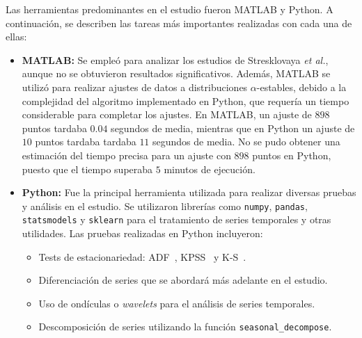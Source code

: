 Las herramientas predominantes en el estudio fueron MATLAB y Python. A continuación, se describen las tareas más importantes realizadas con cada una de ellas:

\begin{itemize}
\item \textbf{MATLAB:} Se empleó para analizar los estudios de Stresklovaya \textit{et al.}, aunque no se obtuvieron resultados significativos. Además, MATLAB se utilizó para realizar ajustes de datos a distribuciones $\alpha$-estables, debido a la complejidad del algoritmo implementado en Python, que requería un tiempo considerable para completar los ajustes. En MATLAB, un ajuste de $898$ puntos tardaba $0.04$ segundos de media, mientras que en Python un ajuste de $10$ puntos tardaba tardaba $11$ segundos de media. No se pudo obtener una estimación del tiempo precisa para un ajuste con $898$ puntos en Python, puesto que el tiempo superaba $5$ minutos de ejecución.
\item \textbf{Python:} Fue la principal herramienta utilizada para realizar diversas pruebas y análisis en el estudio. Se utilizaron librerías como \texttt{numpy}, \texttt{pandas}, \texttt{statsmodels} y \texttt{sklearn} para el tratamiento de series temporales y otras utilidades. Las pruebas realizadas en Python incluyeron:
\begin{itemize}
    \item Tests de estacionariedad: \ac{ADF}~\cite{dickey1979distribution}, \ac{KPSS}~\cite{kwiatkowski1992testing} y \ac{K-S}~\cite{kolmogorov1933sulla}.
    \item Diferenciación de series que se abordará más adelante en el estudio.
    \item Uso de ondículas o \textit{wavelets} para el análisis de series temporales.
    \item Descomposición de series utilizando la función \texttt{seasonal\_decompose}.
\end{itemize}
\end{itemize}

